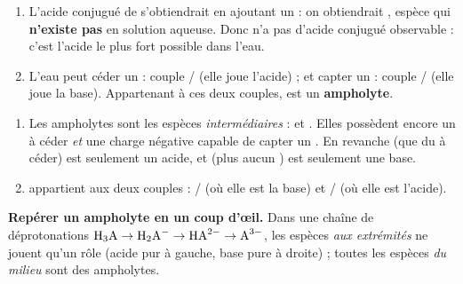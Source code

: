 \documentclass[11pt,a4paper]{article}
\begin{document}
\begin{corrbox}
\begin{enumerate}[label=\alph*),leftmargin=1.6em,itemsep=3pt]
  \item L'acide conjugué de  s'obtiendrait en ajoutant un  : on obtiendrait ,
        espèce qui \textbf{n'existe pas} en solution aqueuse. Donc  n'a pas d'acide conjugué
        observable : c'est l'acide le plus fort possible dans l'eau.
  \item L'eau peut céder un  : couple / (elle joue l'acide) ; et capter un  :
        couple / (elle joue la base). Appartenant à ces deux couples,  est un
        \textbf{ampholyte}.
\end{enumerate}
\end{corrbox}

\begin{corrbox}
\begin{enumerate}[label=\alph*),leftmargin=1.6em,itemsep=3pt]
  \item Les ampholytes sont les espèces \emph{intermédiaires} : \textbf{} et \textbf{}.
        Elles possèdent encore un  à céder \emph{et} une charge négative capable de capter un .
        En revanche  (que du  à céder) est seulement un acide, et  (plus aucun
        ) est seulement une base.
  \item {} appartient aux deux couples : / (où elle est la base) et
        / (où elle est l'acide).
\end{enumerate}
\end{corrbox}

\begin{astuce}
\textbf{Repérer un ampholyte en un coup d'œil.} Dans une chaîne de déprotonations
$\ce{H3A} \to \ce{H2A-} \to \ce{HA^{2-}} \to \ce{A^{3-}}$, les espèces \emph{aux extrémités} ne jouent qu'un
rôle (acide pur à gauche, base pure à droite) ; toutes les espèces \emph{du milieu} sont des ampholytes.
\end{astuce}
\end{document}
